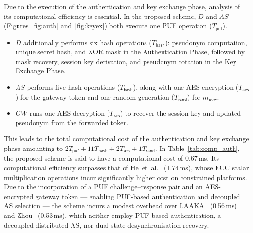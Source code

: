 \documentclass[conference]{IEEEtran}
\begin{document}
Due to the execution of the authentication and key exchange phase, analysis of its
computational efficiency is essential. In the proposed scheme, $D$ and $AS$
(Figures~\ref{fig:auth} and~\ref{fig:keyex}) both execute one PUF operation
($T_{\mathsf{puf}}$).
\begin{itemize}
  \item $D$ additionally performs six hash operations ($T_{\mathsf{hash}}$): pseudonym
        computation, unique secret hash, and XOR mask in the Authentication Phase, followed by mask
        recovery, session key derivation, and pseudonym rotation in the Key Exchange Phase.
  \item $AS$ performs five hash operations ($T_{\mathsf{hash}}$), along with one AES
        encryption ($T_{\mathsf{aes}}$) for the gateway token and one random generation
        ($T_{\mathsf{rand}}$) for $m_{\mathrm{new}}$.
  \item $GW$ runs one AES decryption ($T_{\mathsf{aes}}$) to recover the session key and
        updated pseudonym from the forwarded token.
\end{itemize}

This leads to the total computational cost of the authentication and key exchange phase
amounting to $2T_{\mathsf{puf}} + 11T_{\mathsf{hash}} + 2T_{\mathsf{aes}} + 1T_{\mathsf{rand}}$.
In Table~\ref{tab:comp_auth}, the proposed scheme is said to have a computational cost of
0.67\,ms. Its computational efficiency surpasses that of
He~et~al.~\cite{he2023lightweight} (1.74\,ms), whose ECC scalar multiplication
operations incur significantly higher cost on constrained platforms. Due to the incorporation of a PUF
challenge--response pair and an AES-encrypted gateway token — enabling PUF-based
authentication and decoupled AS selection — the scheme incurs a modest overhead
over LAAKA~\cite{ali2024laaka} (0.56\,ms) and Zhou~\cite{zhou2024auth} (0.53\,ms), which
neither employ PUF-based authentication, a decoupled distributed AS, nor dual-state
desynchronisation recovery.
\end{document}
